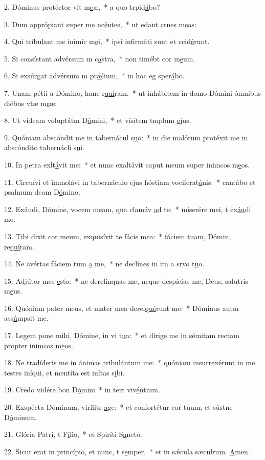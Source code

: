 2. Dóminus protéctor vit m\uline{e}æ,~* a quo trpid\uline{á}bo?\par 
3. Dum apprópiant super me nc\uline{é}ntes,~* ut edant crnes m\uline{e}as:\par 
4. Qui tríbulant me inimíc m\uline{e}i,~* ipsi infirmáti sunt et ccid\uline{é}runt.\par 
5. Si consístant advérsum m c\uline{a}stra,~* non timébt cor m\uline{e}um.\par 
6. Si exsúrgat advérsum m pr\uline{ǽ}lium,~* in hoc eg sper\uline{á}bo.\par 
7. Unam pétii a Dómino, hanc r\uline{quí}ram,~* ut inhábitem in domo Dómini ómnibus diébus vtæ m\uline{e}æ:\par 
8. Ut vídeam voluptátm D\uline{ó}mini,~* et vísitem tmplum \uline{e}jus.\par 
9. Quóniam abscóndit me in tabernácul s\uline{u}o:~* in die malórum protéxit me in abscóndito tabernácli s\uline{u}i.\par 
10. In petra exlt\uline{á}vit me:~* et nunc exaltávit caput meum super inimcos m\uline{e}os.\par 
11. Circuívi et immolávi in tabernáculo ejus hóstiam vociferat\uline{ó}nis:~* cantábo et psalmum dcam D\uline{ó}mino.\par 
12. Exáudi, Dómine, vocem meam, qua clamáv \uline{a}d te:~* miserére mei, t ex\uline{áu}di me.\par 
13. Tibi dixit cor meum, exquisívit te fácis m\uline{e}a:~* fáciem tuam, Dómin, re\uline{quí}ram.\par 
14. Ne avértas fáciem tum \uline{a} me,~* ne declínes in ira a srvo t\uline{u}o.\par 
15. Adjútor mes \uline{e}sto:~* ne derelínquas me, neque despícias me, Deus, salutris m\uline{e}us.\par 
16. Quóniam pater meus, et mater mea derel\uline{qué}runt me:~* Dóminus autm ass\uline{ú}mpsit me.\par 
17. Legem pone mihi, Dómine, in vi t\uline{u}a:~* et dírige me in sémitam rectam propter inimcos m\uline{e}os.\par 
18. Ne tradíderis me in ánimas tribulánt\uline{u}m me:~* quóniam insurrexérunt in me testes iníqui, et mentíta est inítas s\uline{i}bi.\par 
19. Credo vidére bon D\uline{ó}mini~* in terr viv\uline{é}ntium.\par 
20. Exspécta Dóminum, virílitr \uline{a}ge:~* et confortétur cor tuum, et sústne D\uline{ó}minum.\par 
21. Glória Patri, t F\uline{í}lio,~* et Spiríti S\uline{a}ncto.\par 
22. Sicut erat in princípio, et nunc, t s\uline{e}mper,~* et in sǽcula sæculrum. \uline{A}men.\par 
